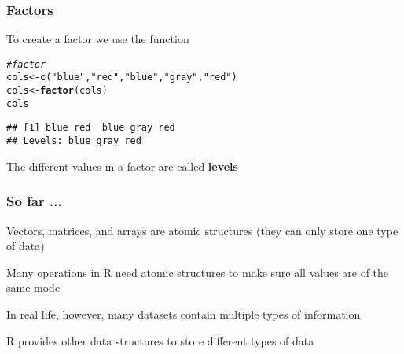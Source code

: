 \documentclass[12pt]{beamer}\usepackage[]{graphicx}\usepackage[]{color}
\makeatletter
\newcommand{\hlstr}[1]{\textcolor[rgb]{0.192,0.494,0.8}{#1}}%
\newcommand{\hlcom}[1]{\textcolor[rgb]{0.678,0.584,0.686}{\textit{#1}}}%
\newcommand{\hlstd}[1]{\textcolor[rgb]{0.345,0.345,0.345}{#1}}%
\newcommand{\hlkwb}[1]{\textcolor[rgb]{0.69,0.353,0.396}{#1}}%
\newcommand{\hlkwd}[1]{\textcolor[rgb]{0.737,0.353,0.396}{\textbf{#1}}}%
\newenvironment{kframe}{%
 \def\at@end@of@kframe{}%
 \ifinner\ifhmode%
  \def\at@end@of@kframe{\end{minipage}}%
  \begin{minipage}{\columnwidth}%
 \fi\fi%
 \def\FrameCommand##1{\hskip\@totalleftmargin \hskip-\fboxsep
 \colorbox{shadecolor}{##1}\hskip-\fboxsep
     \hskip-\linewidth \hskip-\@totalleftmargin \hskip\columnwidth}%
 \MakeFramed {\advance\hsize-\width
   \@totalleftmargin\z@ \linewidth\hsize
   \@setminipage}}%
 {\par\unskip\endMakeFramed%
 \at@end@of@kframe}
\newenvironment{knitrout}{}{} %
\makeatother
\begin{document}

\begin{frame}[fragile]
\frametitle{Factors}

To create a factor we use the function {\hilit {}}
\begin{knitrout}\footnotesize
{}\color{fgcolor}\begin{kframe}
\begin{alltt}
\hlcom{# factor}
\hlstd{cols} \hlkwb{<-} \hlkwd{c}\hlstd{(}\hlstr{"blue"}\hlstd{,} \hlstr{"red"}\hlstd{,} \hlstr{"blue"}\hlstd{,} \hlstr{"gray"}\hlstd{,} \hlstr{"red"}\hlstd{)}
\hlstd{cols} \hlkwb{<-} \hlkwd{factor}\hlstd{(cols)}
\hlstd{cols}
\end{alltt}
\begin{verbatim}
## [1] blue red  blue gray red 
## Levels: blue gray red
\end{verbatim}
\end{kframe}
\end{knitrout}

The different values in a factor are called \textbf{levels}

\end{frame}


\begin{frame}
\frametitle{So far ...}

\bi 
  \item Vectors, matrices, and arrays are atomic structures (they can only store one type of data)
  \item Many operations in R need atomic structures to make sure all values are of the same mode
  \item In real life, however, many datasets contain multiple types of information
  \item R provides other data structures to store different types of data
\ei
\end{frame}


\begin{frame}
\begin{center}
\Huge{}
\end{center}
\end{frame}

\end{document}

